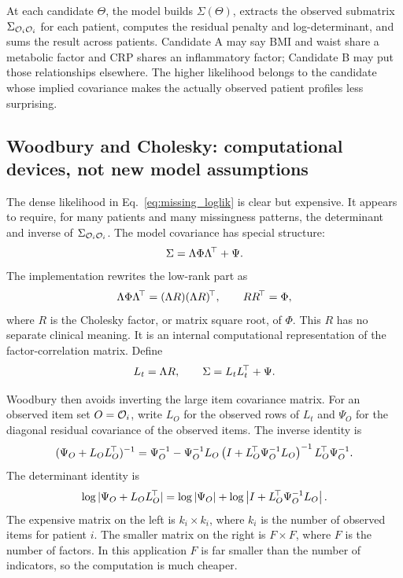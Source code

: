 \begin{methodsbox}
At each candidate $\Theta$, the model builds $\Sigma(\Theta)$, extracts the observed submatrix
$\Sigma_{\mathcal{O}_i\mathcal{O}_i}$ for each patient, computes the residual penalty and log-determinant, and sums the result
across patients. Candidate A may say BMI and waist share a metabolic factor and CRP shares an inflammatory
factor; Candidate B may put those relationships elsewhere. The higher likelihood belongs to the candidate whose
implied covariance makes the actually observed patient profiles less surprising.
\end{methodsbox}

\subsection{Woodbury and Cholesky: computational devices, not new model assumptions}
\label{sub:woodbury}
The dense likelihood in Eq.~\eqref{eq:missing_loglik} is clear but expensive. It appears to require, for many
patients and many missingness patterns, the determinant and inverse of
$\Sigma_{\mathcal{O}_i\mathcal{O}_i}$. The model covariance has special structure:
\begin{equation}
\Sigma=\Lambda\Phi\Lambda^{\!\top}+\Psi.
\end{equation}
The implementation rewrites the low-rank part as
\begin{equation}
\Lambda\Phi\Lambda^{\!\top}=(\Lambda R)(\Lambda R)^{\!\top},
\qquad
RR^{\!\top}=\Phi,
\end{equation}
where $R$ is the Cholesky factor, or matrix square root, of $\Phi$. This $R$ has no separate clinical meaning. It
is an internal computational representation of the factor-correlation matrix. Define
\begin{equation}
L_t=\Lambda R,
\qquad
\Sigma=L_tL_t^{\!\top}+\Psi.
\end{equation}

Woodbury then avoids inverting the large item covariance matrix. For an observed item set $O=\mathcal{O}_i$, write
$L_O$ for the observed rows of $L_t$ and $\Psi_O$ for the diagonal residual covariance of the observed items.
The inverse identity is
\begin{equation}
\label{eq:woodbury_inverse}
(\Psi_O+L_OL_O^{\!\top})^{-1}
=\Psi_O^{-1}-\Psi_O^{-1}L_O
\left(I+L_O^{\!\top}\Psi_O^{-1}L_O\right)^{-1}
L_O^{\!\top}\Psi_O^{-1}.
\end{equation}
The determinant identity is
\begin{equation}
\label{eq:woodbury_det}
\log|\Psi_O+L_OL_O^{\!\top}|
=\log|\Psi_O|+
\log\left|I+L_O^{\!\top}\Psi_O^{-1}L_O\right|.
\end{equation}
The expensive matrix on the left is $k_i\times k_i$, where $k_i$ is the number of observed items for patient $i$.
The smaller matrix on the right is $F\times F$, where $F$ is the number of factors. In this application $F$ is far
smaller than the number of indicators, so the computation is much cheaper.

